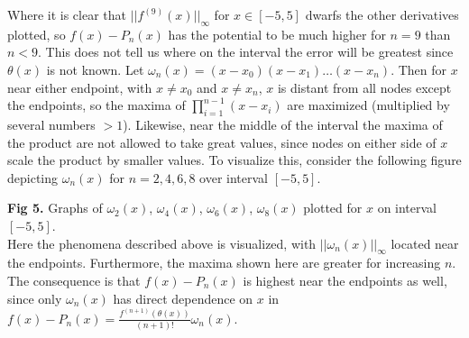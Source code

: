 \documentclass[11pt, letterpaper]{article}
\begin{document}
    \noindent Where it is clear that $||f^{(9)}(x)||_{\infty}$ for $x\in[-5,5]$ dwarfs the other derivatives plotted, so 
    $f(x)-P_n(x)$ has the potential to be much higher for $n=9$ than $n<9$. This does not tell us where on the interval
    the error will be greatest since $\theta(x)$ is not known. Let $\omega_n(x)=(x-x_0)(x-x_1)\dots(x-x_n)$. Then for $x$ near
    either endpoint, with $x\neq x_0$ and $x\neq x_n$, $x$ is distant from all nodes except the endpoints, so the maxima of $\prod_{i=1}^{n-1}(x-x_i)$
    are maximized (multiplied by several numbers $>1$). Likewise, near the middle of the interval the maxima of the product 
    are not allowed to take great values, since nodes on either side of $x$ scale the product by smaller values. 
    To visualize this, consider the following figure depicting $\omega_n(x)$ for $n=2,4,6,8$ over interval $[-5,5]$.
    \begin{center}
    \end{center} 
    {\bf Fig 5.} Graphs of $\omega_2(x)$, $\omega_4(x)$, $\omega_6(x)$, $\omega_8(x)$ plotted for $x$ on interval
    $[-5,5]$. \\

    \noindent Here the phenomena described above is visualized, with $||\omega_n(x)||_{\infty}$ located near the endpoints. Furthermore,
    the maxima shown here are greater for increasing $n$.
    The consequence is that $f(x)-P_n(x)$ is highest near the endpoints as well, since only $\omega_n(x)$ has direct
    dependence on $x$ in $f(x)-P_n(x)=\frac{f^{(n+1)}(\theta(x))}{(n+1)!}\omega_n(x)$. 
\end{document}
